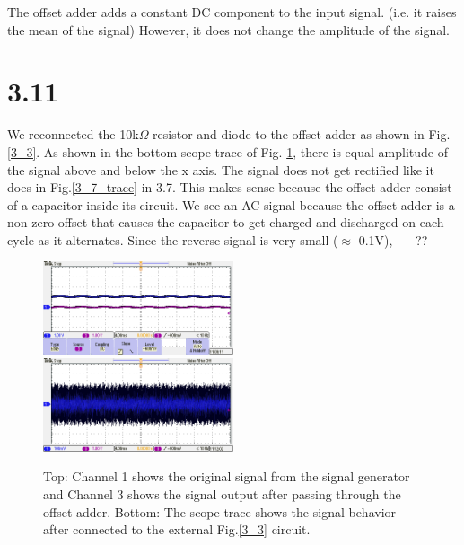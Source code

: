 \documentclass[authoryear, 12pt,5p, times]{elsarticle}
\begin{document}
The offset adder adds a constant DC component to the input signal. (i.e. it raises the mean of the signal) However, it does not change the amplitude of the signal.
 
\section*{3.11}
We reconnected the 10k$\Omega$ resistor and diode to the offset adder as shown in  Fig.\ref{3_3}. As shown in the bottom scope trace of Fig. \ref{3_11}, there is equal amplitude of the signal above and below the x axis. The signal does not get rectified like it does in Fig.\ref{3_7_trace} in 3.7.  This makes sense because the offset adder consist of a capacitor inside its circuit. We see an AC signal because the offset adder is a non-zero offset that causes the capacitor to get charged and discharged on each cycle as it alternates. Since the reverse signal is very small ($\approx$ 0.1V),  -----??
\begin{figure}[h!]
\center
\includegraphics[width=0.5\textwidth]{figure/TEK00022}
\includegraphics[width=0.5\textwidth]{figure/TEK00024}
\caption{Top: Channel 1 shows the original signal from the signal generator and Channel 3 shows the signal output after passing through the offset adder. Bottom: The scope trace shows the signal behavior after connected to the external Fig.\ref{3_3} circuit.}
\label{3_11}
\end{figure}
\end{document}
